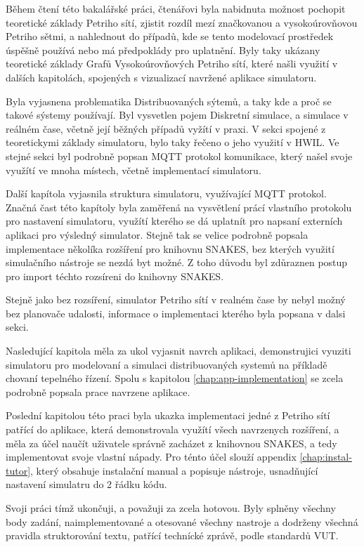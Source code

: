 Během čtení této bakalářské práci, čtenářovi byla nabidnuta možnost pochopit teoretické základy Petriho sítí, zjistit rozdíl mezí značkovanou a vysokoúrovňovou Petriho sětmi, a nahlednout do případů, kde se tento modelovací prostředek úspěšně používá nebo má předpoklády pro uplatnění. Byly taky ukázany teoretické základy Grafů Vysokoúrovňových Petriho sítí, které našli využití v dalších kapitolách, spojených s vizualizací navržené aplikace simulatoru.

Byla vyjasnena problematika Distribuovaných sýtemů, a taky kde a proč se takové sýstemy používají. Byl vysvetlen pojem Diskretní simulace, a simulace v reálném čase, včetně její běžných případů vyžítí v praxi. V sekci spojené z teoretickymi základy simulatoru, bylo taky řečeno o jeho využití v HWIL. Ve stejné sekci byl podrobně popsan MQTT protokol komunikace, který našel svoje využítí ve mnoha místech, včetně implementací simulatoru.

Další kapítola vyjasnila struktura simulatoru, využívající MQTT protokol. Značná čast této kapítoly byla zaměřená na vysvětlení prácí vlastního protokolu pro nastavení simulatoru, využítí kterého se dá uplatnít pro napsaní externích aplikaci pro výsledný simulator. Stejně tak se velice podrobně popsala implementace několíka rozšíření pro knihovnu SNAKES, bez kterých využití simulačního nástroje se nezdá byt možné. Z toho důvodu byl zdůraznen postup pro import téchto rozsíreni do knihovny SNAKES.

Stejně jako bez rozsíření, simulator Petriho sítí v realném čase by nebyl možný bez planovače udalosti, informace o implementaci kterého byla popsana v dalsi sekci.

Nasledující kapitola měla za ukol vyjasnit navrch aplikaci, demonstrujici vyuziti simulatoru pro modelovaní a simulaci distribuovaných systemů na příkladě chovaní tepelného řízení. Spolu s kapitolou \ref{chap:app-implementation} se zcela podrobně popsala prace navrzene aplikace.

Poslední kapitolou této praci byla ukazka implementaci jedné z Petriho sítí patřící do aplikace, která demonstrovala využítí všech navrzenych rozšíření, a měla za účel naučít uživatele správně zacházet z knihovnou SNAKES, a tedy implementovat svoje vlastní nápady. Pro ténto účel slouží appendix \ref{chap:instal-tutor}, který obsahuje instalační manual a popisuje nástroje, usnadňující nastavení simulatru do 2 řádku kódu.

Svoji práci tímž ukončuji, a považuji za zcela hotovou. Byly splněny všechny body zadání, naimplementované a otesované všechny nastroje a dodrženy všechná pravidla struktorování textu, patřící technícké zprávě, podle standardů VUT.





